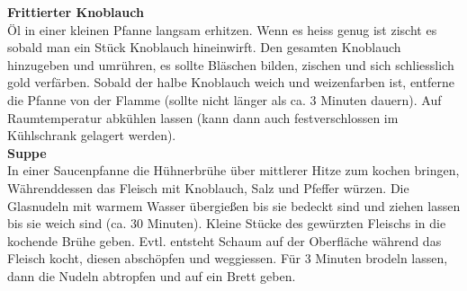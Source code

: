 \hrulefill
\vspace*{\fill}
\begin{multicols}{2}
\textbf{Frittierter Knoblauch}\\
Öl in einer kleinen Pfanne langsam erhitzen.
Wenn es heiss genug ist zischt es sobald man ein Stück Knoblauch hineinwirft.
Den gesamten Knoblauch hinzugeben und umrühren, es sollte Bläschen bilden, zischen und sich
schliesslich gold verfärben. 
Sobald der halbe Knoblauch weich und weizenfarben ist, entferne die Pfanne von der Flamme
(sollte nicht länger als ca. 3 Minuten dauern).
Auf Raumtemperatur abkühlen lassen (kann dann auch festverschlossen im Kühlschrank gelagert werden).\\
\textbf{Suppe}\\
In einer Saucenpfanne die Hühnerbrühe über mittlerer Hitze zum kochen bringen,
Währenddessen das Fleisch mit Knoblauch, Salz und Pfeffer würzen.
Die Glasnudeln mit warmem Wasser übergießen bis sie bedeckt sind und
ziehen lassen bis sie weich sind (ca. 30 Minuten).
Kleine Stücke des gewürzten Fleischs in die kochende Brühe geben.
Evtl. entsteht Schaum auf der Oberfläche während das Fleisch kocht, diesen abschöpfen und weggiessen. 
Für 3 Minuten brodeln lassen, dann die Nudeln abtropfen und auf ein Brett geben.

\end{multicols}
